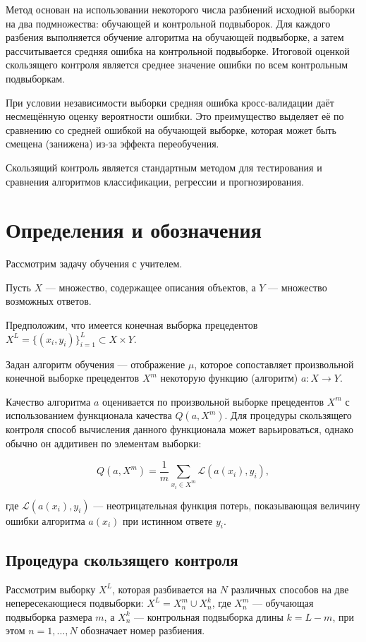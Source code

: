 Метод основан на использовании некоторого числа разбиений исходной выборки на два подмножества: обучающей и контрольной подвыборок. Для каждого разбения выполняется обучение алгоритма на обучающей подвыборке, а затем рассчитывается средняя ошибка на контрольной подвыборке. Итоговой оценкой скользящего контроля является среднее значение ошибки по всем контрольным подвыборкам.

При условии независимости выборки средняя ошибка кросс-валидации даёт несмещённую оценку вероятности ошибки. Это преимущество выделяет её по сравнению со средней ошибкой на обучающей выборке, которая может быть смещена (занижена) из-за эффекта переобучения.

Скользящий контроль является стандартным методом для тестирования и сравнения алгоритмов классификации, регрессии и прогнозирования.

\section{Определения и обозначения}

Рассмотрим задачу обучения с учителем.

Пусть $X$ — множество, содержащее описания объектов, а $Y$ — множество возможных ответов.

Предположим, что имеется конечная выборка прецедентов $X^L = \{(x_i, y_i)\}_{i=1}^L \subset X \times Y$.

Задан алгоритм обучения — отображение $\mu$, которое сопоставляет произвольной конечной выборке прецедентов $X^m$ некоторую функцию (алгоритм) $a : X \to Y$.

Качество алгоритма $a$ оценивается по произвольной выборке прецедентов $X^m$ с использованием функционала качества $Q(a, X^m)$. Для процедуры скользящего контроля способ вычисления данного функционала может варьироваться, однако обычно он аддитивен по элементам выборки:

\[
Q(a, X^m) = \frac{1}{m} \sum_{x_i \in X^m} \mathcal{L}(a(x_i), y_i),
\]

где $\mathcal{L}(a(x_i), y_i)$ — неотрицательная функция потерь, показывающая величину ошибки алгоритма $a(x_i)$ при истинном ответе $y_i$.

\subsection{Процедура скользящего контроля}

Рассмотрим выборку $X^L$, которая разбивается на $N$ различных способов на две непересекающиеся подвыборки: $X^L = X^m_n \cup X^k_n$, где $X^m_n$ — обучающая подвыборка размера $m$, а $X^k_n$ — контрольная подвыборка длины $k = L - m$, при этом $n = 1, \ldots, N$ обозначает номер разбиения.

